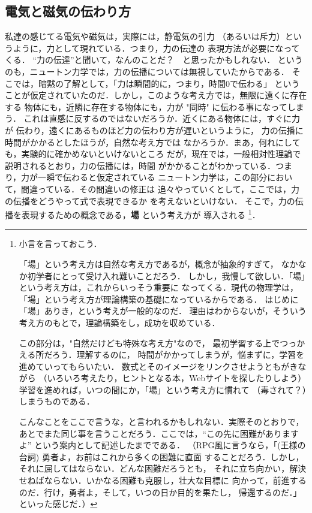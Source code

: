     \subsection{電気と磁気の伝わり方}%
        私達の感じてる電気や磁気は，実際には，静電気の引力
        （あるいは斥力）というように，力として現れている．つまり，力の伝達の
        表現方法が必要になってくる．
        “力の伝達”と聞いて，なんのことだ？　と思ったかもしれない．
        というのも，ニュートン力学では，力の伝播については無視していたからである．
        そこでは，暗黙の了解として，「力は瞬間的に，つまり，時間0で伝わる」
        ということが仮定されていたのだ．しかし，このような考え方では，無限に遠くに存在する
        物体にも，近隣に存在する物体にも，力が "同時" に伝わる事になってしまう．
        これは直感に反するのではないだろうか．近くにある物体には，すぐに力が
        伝わり，遠くにあるものほど力の伝わり方が遅いというように，
        力の伝播に時間がかかるとしたほうが，自然な考え方では
        なかろうか．まあ，何れにしても，実験的に確かめないといけないところ
        だが，現在では，一般相対性理論で説明されるとおり，力の伝播には，時間
        がかかることがわかっている．つまり，力が一瞬で伝わると仮定されている
        ニュートン力学は，この部分において，間違っている．その間違いの修正は
        追々やっていくとして，ここでは，力の伝播をどうやって式で表現できるか
        を考えないといけない．
        そこで，力の伝播を表現するための概念である，\textbf{場} という考え方が
        導入される
            \footnote{
                小言を言っておこう．

                「場」という考え方は自然な考え方であるが，概念が抽象的すぎて，
                なかなか初学者にとって受け入れ難いことだろう．
                しかし，我慢して欲しい．「場」という考え方は，これからいっそう重要に
                なってくる．現代の物理学は，「場」という考え方が理論構築の基礎になっているからである．
                はじめに「場」ありき，という考えが一般的なのだ．
                理由はわからないが，そういう考え方のもとで，理論構築をし，成功を収めている．

                この部分は，"自然だけども特殊な考え方"なので，
                最初学習する上でつっかえる所だろう．理解するのに，
                時間がかかってしまうが，悩まずに，学習を進めていってもらいたい．
                数式とそのイメージをリンクさせようともがきながら
                （いろいろ考えたり，ヒントとなる本，Webサイトを探したりしよう）
                学習を進めれば，いつの間にか，「場」という考え方に慣れて
                （毒されて？）しまうものである．

                こんなことをここで言うな，と言われるかもしれない．実際そのとおりで，
                あとでまた同じ事を言うことだろう．ここでは，“この先に困難がありますよ”
                という案内として記述したまでである．
                （RPG風に言うなら，「(王様の台詞) 勇者よ，お前はこれから多くの困難に直面
                することだろう．しかし，それに屈してはならない．どんな困難だろうとも，
                それに立ち向かい，解決せねばならない．いかなる困難も克服し，壮大な目標に
                向かって，前進するのだ．行け，勇者よ，そして，いつの日か目的を果たし，
                帰還するのだ．」といった感じだ．）
            }．

